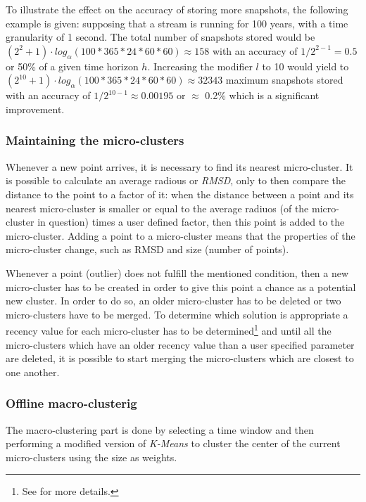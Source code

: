 \documentclass[10pt, conference, compsocconf]{IEEEtran}
\begin{document}
To illustrate the effect on the accuracy of storing more snapshots, the following example is given: supposing that a stream is running for 100 years, with a time granularity of 1 second. The total number of snapshots stored would be $(2^2 + 1)\cdot log_{\alpha}(100*365*24*60*60) \approx 158$ with an accuracy of $1/ 2^{2-1} = 0.5$ or 50\% of a given time horizon $h$. Increasing the modifier $l$ to 10 would yield to $(2^{10} + 1)\cdot log_{\alpha}(100*365*24*60*60) \approx 32343$ maximum snapshots stored with an accuracy of $1/ 2^{10-1} \approx 0.00195$ or $\approx$ 0.2\% which is a significant improvement.

\subsubsection{Maintaining the micro-clusters}

Whenever a new point arrives, it is necessary to find its nearest micro-cluster. It is possible to calculate an average radious or \textit{RMSD}, only to then compare the distance to the point to a factor of it: when the distance between a point and its nearest micro-cluster is smaller or equal to the average radiuos (of the micro-cluster in question) times a user defined factor, then this point is added to the micro-cluster. Adding a point to a micro-cluster means that the properties of the micro-cluster change, such as RMSD and size (number of points).

Whenever a point (outlier) does not fulfill the mentioned condition, then a new micro-cluster has to be created in order to give this point a chance as a potential new cluster. In order to do so, an older micro-cluster has to be deleted or two micro-clusters have to be merged. To determine which solution is appropriate a recency value for each micro-cluster has to be determined\footnote{See \cite{clustreamOrig} for more details.} and until all the micro-clusters which have an older recency value than a user specified parameter are deleted, it is possible to start merging the micro-clusters which are closest to one another.

\subsubsection{Offline macro-clusterig}

The macro-clustering part is done by selecting a time window and then performing a modified version of \textit{K-Means} to cluster the center of the current micro-clusters using the size as weights. 
\end{document}
